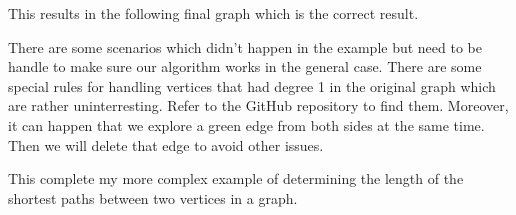 This results in the following final graph which is the correct result.

\begin{center}
\end{center}

There are some scenarios which didn't happen in the example but need to be handle to make sure our algorithm works in the general case.
There are some special rules for handling vertices that had degree 1 in the original graph which are rather uninterresting.
Refer to the GitHub repository to find them.
Moreover, it can happen that we explore a green edge from both sides at the same time.
Then we will delete that edge to avoid other issues.

\begin{center}
\end{center}

This complete my more complex example of determining the length of the shortest paths between two vertices in a graph.
